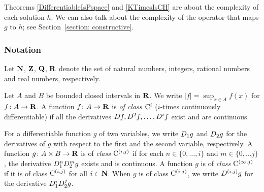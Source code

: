 Theorems \ref{DifferentiableIsPspace} and \ref{KTimesIsCH} 
are about the complexity of each solution $h$. 
We can also talk about 
the complexity of the operator that maps $g$ to $h$; 
see Section~\ref{section: constructive}. 

\subsubsection*{Notation}
Let $\mathbf N$, $\mathbf Z$, $\mathbf Q$, $\mathbf R$ denote the set of natural numbers,
integers,
rational numbers and 
real numbers, respectively.

Let $A$ and $B$ be bounded closed intervals in $\mathbf R$.
We write $|f| = \sup_{x \in A} f(x)$ for $f \colon A \to \mathbf R$.
A function $f \colon A \to \mathbf R$ is \emph{of class $\mathrm C^i$}
($i$-times continuously differentiable)
if all the derivatives $D f, D^2 f, \dots, D^i f$ exist and are continuous.

For a differentiable function $g$ of two variables, 
we write $D _1 g$ and $D _2 g$ for the derivatives of $g$ 
with respect to the first and the second variable,
respectively.
A function $g \colon A \times B \to \mathbf R$ is of \emph{class $\mathrm C^{(i, j)}$}
if for each $n \in \{0, \dots, i\}$ and $m \in \{0, \dots j\}$,
the derivative $D_1^n D_2^m g$ exists and is continuous.
A function $g$ is of \emph{class $\mathrm C^{(\infty, j)}$}
if it is of class $\mathrm C^{(i, j)}$ for all $i \in \mathbf N$.
When $g$ is of class $\mathrm C^{(i,j)}$,
we write $D^{(i,j)}g$ for the derivative $D_1^i D_2^j g$.
